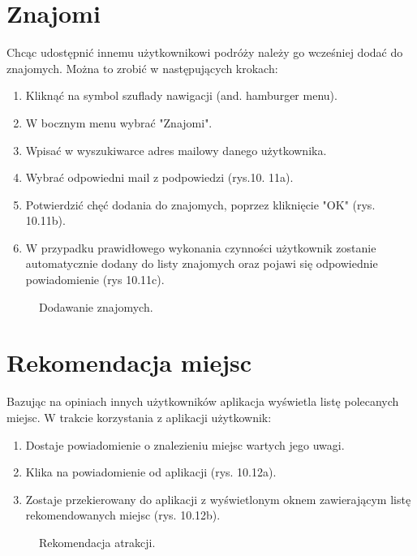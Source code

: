 \section{Znajomi}
Chcąc udostępnić innemu użytkownikowi podróży należy go wcześniej dodać do znajomych. Można to zrobić w następujących krokach:
\begin{enumerate}
\item Kliknąć na symbol szuflady nawigacji (and. hamburger menu).
\item W bocznym menu wybrać "Znajomi".
\item Wpisać w wyszukiwarce adres mailowy danego użytkownika.
\item Wybrać odpowiedni mail z podpowiedzi (rys.10. 11a).
\item Potwierdzić chęć dodania do znajomych, poprzez kliknięcie "OK" (rys. 10.11b).
\item W przypadku prawidłowego wykonania czynności użytkownik zostanie automatycznie dodany do listy znajomych oraz pojawi się odpowiednie powiadomienie (rys 10.11c).
\end{enumerate}

\begin{figure}[h]

\null\hfill
{}
\hfill
{}
\hfill
{}
\hfill\null

\caption{Dodawanie znajomych.}
\label{fig:podrecznik9}
\end{figure}
\FloatBarrier


\section{Rekomendacja miejsc}
Bazując na opiniach innych użytkowników aplikacja wyświetla listę polecanych miejsc. W trakcie korzystania z aplikacji użytkownik:
\begin{enumerate}
\item Dostaje powiadomienie o znalezieniu miejsc wartych jego uwagi.
\item Klika na powiadomienie od aplikacji (rys. 10.12a).
\item Zostaje przekierowany do aplikacji z wyświetlonym oknem zawierającym listę rekomendowanych miejsc (rys. 10.12b).
\end{enumerate}
\begin{figure}[h]

\centering
\null\hfill
{}
\hfill
{}
\hfill\null

\caption{Rekomendacja atrakcji.}
\label{fig:podrecznik11}
\end{figure}
\FloatBarrier